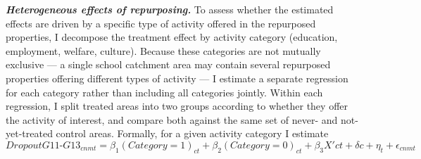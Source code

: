\documentclass[12pt]{article}
\theoremstyle{plain}
\theoremstyle{plain}
\theoremstyle{plain}
\theoremstyle{definition}
\theoremstyle{plain}
\theoremstyle{definition}
\theoremstyle{plain}
\theoremstyle{remark}
\theoremstyle{definition}
\theoremstyle{definition}
\theoremstyle{plain}
\begin{document}
\begin{table}[H]
\centering
\caption{RAV School Quality Indicators}
    \end{table}


 \textbf{\emph{Heterogeneous effects of repurposing.}} To assess whether the estimated effects are driven by a specific type of activity offered in the repurposed properties, I decompose the treatment effect by activity category (education, employment, welfare, culture). Because these categories are not mutually exclusive — a single school catchment area may contain several repurposed properties offering different types of activity — I estimate a separate regression for each category rather than including all categories jointly. Within each regression, I split treated areas into two groups according to whether they offer the activity of interest, and compare both against the same set of never- and not-yet-treated control areas. Formally, for a given activity category I estimate
 	\begin{equation}
 	DropoutG11\text{-}G13_{cnmt} = \beta_1 (Category =1)_{ct} + \beta_2 (Category = 0)_{ct} + \beta_3 X'{ct} + \delta{c} + \eta_{t} + \epsilon_{cnmt}
 \end{equation}
 
\end{document}
